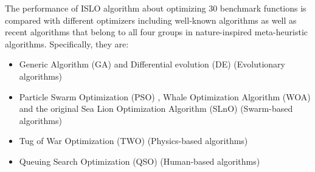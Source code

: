 \documentclass[a4paper,13pt,2p]{report}
\begin{document}
The performance of ISLO algorithm about optimizing 30 benchmark functions is compared with different optimizers including well-known algorithms as well as recent algorithms that belong to all four groups in nature-inspired meta-heuristic algorithms. Specifically, they are: 
\begin{itemize}
\item Generic Algorithm (GA) \cite{whitley1994genetic} and Differential evolution (DE) \cite{price2013differential} (Evolutionary algorithms)
\item Particle Swarm Optimization (PSO) \cite{kennedy2010particle}, Whale Optimization Algorithm (WOA) \cite{mirjalili2016whale} and the original Sea Lion Optimization Algorithm (SLnO) \cite{masadeh2019sea} (Swarm-based algorithms)
\item Tug of War Optimization (TWO) \cite{kaveh2016novel} (Physics-based algorithms)
\item Queuing Search Optimization (QSO) \cite{zhang2018queuing} (Human-based algorithms)
\end{itemize}
\end{document}
